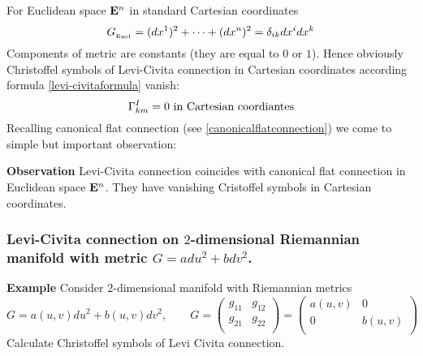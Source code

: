 \documentclass[12pt]{article}
\theoremstyle{theorem}
\numberwithin{equation}{section}
\begin{document}
For Euclidean space ${\bf E}^n$ in standard Cartesian coordinates
               $$
               G_{_{\rm Eucl}}=(dx^1)^2+\dots+(dx^n)^2=\delta_{ik}dx^idx^k
               $$
    Components of metric are constants (they are equal to $0$ or $1$). Hence obviously
    Christoffel symbols of Levi-Civita connection in Cartesian coordinates according
    formula \eqref{levi-civitaformula} vanish:
               $$
              \Gamma^I_{km}=0 \hbox {\,\,in Cartesian coordiantes}
               $$
Recalling canonical flat connection (see \ref{canonicalflatconnection})
we come to simple but important observation:

{\bf Observation} Levi-Civita connection coincides with canonical flat connection
in Euclidean space ${\bf E}^n$. They have
 vanishing Cristoffel symbols in Cartesian coordinates.


\subsubsection {Levi-Civita connection on $2$-dimensional Riemannian
manifold with metric $G=adu^2+bdv^2$.}

{\bf Example} Consider $2$-dimensional manifold with Riemannian metrics
                  $$
                  G=a(u,v)du^2+b(u,v)dv^2, \qquad
                  G=\begin{pmatrix}
                       g_{11} &g_{12}\\
                       g_{21}  &g_{22}\\
                     \end{pmatrix}=
         \begin{pmatrix}
                       a(u,v) &0\\
                       0  &b(u,v)\\
                     \end{pmatrix}
                  $$
Calculate Christoffel symbols of Levi Civita connection.
\end{document}
